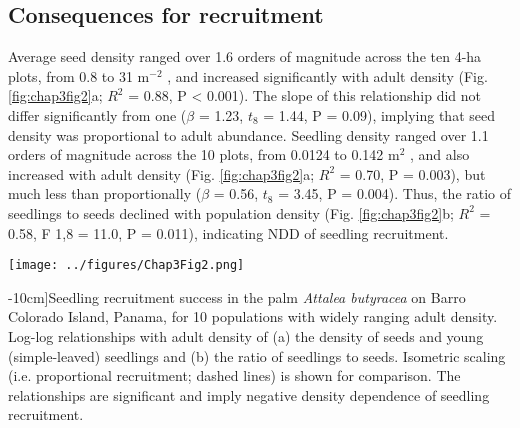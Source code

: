 \documentclass[b5paper,justified]{tufte-book} %
\begin{document}
\begin{fullwidth}
\subsection{Consequences for recruitment}
Average seed density ranged over 1.6 orders of magnitude across the ten 4-ha plots, from 0.8 to 31 m$^{-2}$ , and increased significantly with adult density (Fig. \ref{fig:chap3fig2}a; $R^2$ = 0.88, P < 0.001). The slope of this relationship did not differ significantly from one ($\beta$ = 1.23, $t_8$ = 1.44, P = 0.09), implying that seed density was proportional to adult abundance. Seedling density ranged over 1.1 orders of magnitude across the 10 plots, from 0.0124 to 0.142 m$^2$ , and also increased with adult density (Fig. \ref{fig:chap3fig2}a; $R^2$ = 0.70, P = 0.003), but much less than proportionally ($\beta$ = 0.56, $t_8$ = 3.45, P = 0.004). Thus, the ratio of seedlings to seeds declined with population density (Fig. \ref{fig:chap3fig2}b; $R^2$ = 0.58, F 1,8 = 11.0, P = 0.011), indicating NDD of seedling recruitment.  


\begin{figure*}
\hspace{1.5cm}
\texttt{[image: ../figures/Chap3Fig2.png]}
\caption[Seedling recruitment success in the palm \textit{Attalea butyracea}][-10cm]{Seedling recruitment success in the palm \textit{Attalea butyracea} on Barro Colorado Island, Panama, for 10 populations with widely ranging adult density. Log-log relationships with adult density of (a) the density of seeds and young (simple-leaved) seedlings and (b) the ratio of seedlings to seeds. Isometric scaling (i.e. proportional recruitment; dashed lines) is shown for comparison. The relationships are significant and imply negative density dependence of seedling recruitment. }
\label{fig:chap3fig2}
\end{figure*}


\end{fullwidth}
\end{document}
